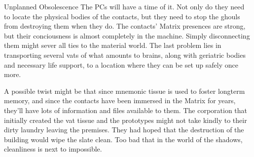 \begin{scenario}{Unplanned Obsolescence}
\notes The PCs will have a time of it. Not only do they need to locate the physical bodies of the contacts, but they need to stop the ghouls from destroying them when they do. The contacts' Matrix presences are strong, but their conciousness is almost completely in the machine. Simply disconnecting them might sever all ties to the material world. The last problem lies in transporting several vats of what amounts to brains, along with geriatric bodies and necessary life support, to a location where they can be set up safely once more.

A possible twist might be that since mnemonic tissue is used to foster longterm memory, and since the contacts have been immersed in the Matrix for years, they'll have lots of information and files available to them. The corporation that initially created the vat tissue and the prototypes might not take kindly to their dirty laundry leaving the premises. They had hoped that the destruction of the building would wipe the slate clean. Too bad that in the world of the shadows, cleanliness is next to impossible. 

\end{scenario}